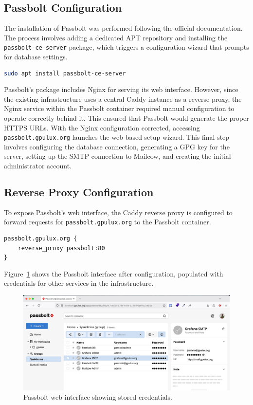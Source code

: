 \subsection*{Passbolt Configuration}

The installation of Passbolt was performed following the official documentation\cite{passbolt-install-debian}. The process involves adding a dedicated APT repository and installing the \texttt{passbolt-ce-server} package, which triggers a configuration wizard that prompts for database settings.

\begin{lstlisting}[language=bash,caption={Installing Passbolt CE server package.}]
sudo apt install passbolt-ce-server
\end{lstlisting}

Passbolt's package includes Nginx for serving its web interface. However, since the existing infrastructure uses a central Caddy instance as a reverse proxy, the Nginx service within the Passbolt container required manual configuration to operate correctly behind it. This ensured that Passbolt would generate the proper HTTPS URLs.
With the Nginx configuration corrected, accessing \texttt{passbolt.gpulux.org} launches the web-based setup wizard. This final step involves configuring the database connection, generating a GPG key for the server, setting up the SMTP connection to Mailcow, and creating the initial administrator account.

\subsection*{Reverse Proxy Configuration}

To expose Passbolt's web interface, the Caddy reverse proxy is configured to forward requests for \texttt{passbolt.gpulux.org} to the Passbolt container.

\begin{lstlisting}[caption={Caddyfile configuration to reverse proxy Passbolt.}]
passbolt.gpulux.org {
    reverse_proxy passbolt:80
}
\end{lstlisting}

Figure~\ref{fig:passbolt-gpulux} shows the Passbolt interface after configuration, populated with credentials for other services in the infrastructure.

\begin{figure}[H]
	\centering
	\includegraphics[width=\textwidth]{imaxes/passbolt-gpulux.png}
	\caption{Passbolt web interface showing stored credentials.}
	\label{fig:passbolt-gpulux}
\end{figure}

